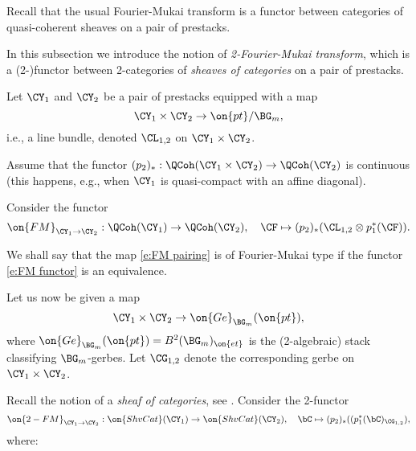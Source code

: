 \documentclass[9pt]{amsart}
\theoremstyle{remark}
\theoremstyle{definition}
\theoremstyle{remark}
\numberwithin{equation}{section}
\begin{document}

Recall that the usual Fourier-Mukai transform is a functor between categories of quasi-coherent sheaves on a 
pair of prestacks.

\medskip

In this subsection we introduce the notion of \emph{2-Fourier-Mukai transform}, which is a (2-)functor between
2-categories of \emph{sheaves of categories} on a pair of prestacks.

\sssec{}

Let $\CY_1$ and $\CY_2$ be a pair of prestacks equipped with a map
\begin{equation} \label{e:FM pairing}
\CY_1\times \CY_2\to \on{pt}/\BG_m,
\end{equation}
i.e., a line bundle, denoted $\CL_{1,2}$ on $\CY_1\times \CY_2$.

\medskip

Assume that the functor $(p_2)_*:\QCoh(\CY_1\times \CY_2)\to \QCoh(\CY_2)$ is continuous
(this happens, e.g., when $\CY_1$ is quasi-compact with an affine diagonal). 

\medskip

Consider the functor
\begin{equation} \label{e:FM functor}
\on{FM}_{\CY_1\to \CY_2}:\QCoh(\CY_1)\to \QCoh(\CY_2), \quad 
\CF\mapsto (p_2)_*(\CL_{1,2}\otimes p_1^*(\CF)).
\end{equation}

We shall say that the map \eqref{e:FM pairing} is of Fourier-Mukai type if the functor \eqref{e:FM functor}
is an equivalence.

\sssec{}

Let us now be given a map 
\begin{equation} \label{e:2-FM pairing}
\CY_1\times \CY_2\to \on{Ge}_{\BG_m}(\on{pt}),
\end{equation}
where $\on{Ge}_{\BG_m}(\on{pt}) = B^2(\BG_m)_{\on{et}}$ is the (2-algebraic) stack classifying $\BG_m$-gerbes. Let
$\CG_{1,2}$ denote the corresponding gerbe on $\CY_1\times \CY_2$.

\medskip

Recall the notion of a \emph{sheaf of categories}, see \cite[Sect. 1.1]{Ga3}. Consider the 2-functor
\begin{equation} \label{e:2-FM functor}
\on{2-FM}_{\CY_1\to \CY_2}:\on{ShvCat}(\CY_1)\to \on{ShvCat}(\CY_2), \quad
\bC\mapsto (p_2)_*((p_1^*(\bC)_{\CG_{1,2}}),
\end{equation}
where:
\end{document}
